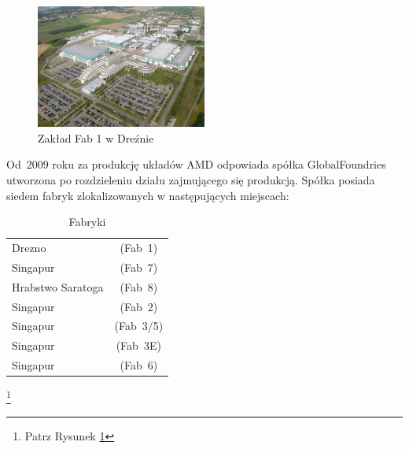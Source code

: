 \documentclass[a4paper,12pt]{article}
\begin{document}
\begin{figure}[h]
\centering
\includegraphics[width=0.5\textwidth]{fab1.jpg}
\caption{Zakład Fab 1 w Dreźnie}\label{Fab 1}
\end{figure}

Od~2009 roku za produkcję układów AMD odpowiada spółka GlobalFoundries utworzona po rozdzieleniu działu zajmującego się produkcją. Spółka posiada siedem fabryk zlokalizowanych w następujących miejscach:

\begin{table}[h]
\centering \caption{Fabryki}
\begin{tabular}{lc}
\hline
Drezno&(Fab~1)\\
Singapur&(Fab~7)\\
Hrabstwo Saratoga&(Fab~8)\\
Singapur&(Fab~2)\\
Singapur&(Fab~3/5)\\
Singapur&(Fab~3E)\\
Singapur&(Fab~6)\\
\end{tabular}
\end{table}

\footnote{Patrz Rysunek \ref{Fab 1}}
\end{document}
